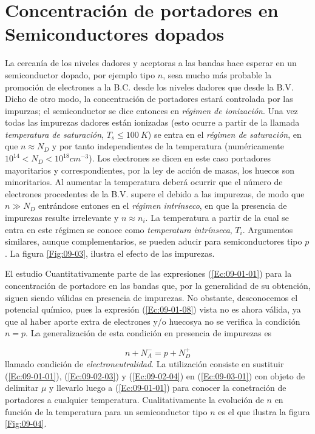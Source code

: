 \section{Concentración de portadores en Semiconductores dopados}

La cercanía de los niveles dadores y aceptoras a las bandas hace esperar en un semiconductor dopado, por ejemplo tipo $n$, sesa mucho más probable la promoción de electrones a la B.C. desde los niveles dadores que desde la B.V. Dicho de otro modo, la concentración de portadores estará controlada por las impurzas; el semiconductor se dice entonces en \textit{régimen de ionización}. Una vez todas las impurezas dadores están ionizadas (esto ocurre a partir de la llamada \textit{temperatura de saturación}, $T_s \leq 100 \ \unit{K}$) se entra en el \textit{régimen de saturación}, en que $n\approx N_D$ y por tanto independientes de la temperatura (numéricamente $10^{14}<N_D<10^{18} \unit{cm^{-3}}$). Los electrones se dicen en este caso portadores mayoritarios y correspondientes, por la ley de acción de masas, los huecos son minoritarios. Al aumentar la temperatura deberá ocurrir que el número de electrones procedentes de la B.V. supere el debido a las impurezas, de modo que $n\gg N_D$ entrándose entones en el \textit{régimen intrínseco}, en que la presencia de impurezas resulte irrelevante y $n\approx n_i$. La temperatura a partir de la cual se entra en este régimen se conoce como \textit{temperatura intrínseca}, $T_i$. Argumentos similares, aunque complementarios, se pueden aducir para semiconductores tipo $p$. La figura \ref{Fig:09-03}, ilustra el efecto de las impurezas.

El estudio Cuantitativamente parte de las expresiones (\ref{Ec:09-01-01}) para la concentración de portadore en las bandas que, por la generalidad de su obtención, siguen siendo válidas en presencia de impurezas. No obstante, desconocemos el potencial químico, pues la expresión (\ref{Ec:09-01-08}) vista no es ahora válida, ya que al haber aporte extra de electrones y/o huecosya no se verifica la condición $n=p$. La generalización de esta condición en presencia de impurezas es 

\begin{equation}
	n+N_A^- = p + N_D^+ \label{Ec:09-03-01}
\end{equation}
llamado condición de \textit{electroneutralidad}. La utilización consiste en sustituir (\ref{Ec:09-01-01}), (\ref{Ec:09-02-03}) y (\ref{Ec:09-02-04}) en (\ref{Ec:09-03-01}) con objeto de delimitar $\mu$ y llevarlo luego a (\ref{Ec:09-01-01}) para conocer la conetración de portadores a cualquier temperatura. Cualitativamente la evolución de $n$ en función de la temperatura para un semiconductor tipo $n$ es el que ilustra la figura \ref{Fig:09-04}.

